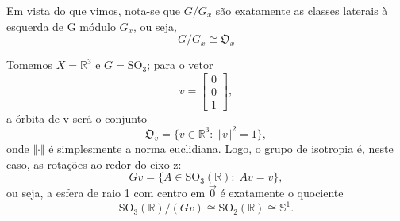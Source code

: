 \documentclass[../algebraIII_notes.tex]{subfiles}
\begin{document}
\begin{tcolorbox}[
		skin=enhanced,
		title=Observação,
		fonttitle=\bfseries,
		colframe=black,
		colbacktitle=cyan!75!white,
		colback=cyan!15,
		colbacklower=black,
		coltitle=black,
		drop fuzzy shadow,
	]
	Em vista do que vimos, nota-se que \(G/G_{x}\) são exatamente as classes laterais à esquerda de G módulo \(G_{x}\), ou seja,
	\[
		G/G_{x}\cong \mathfrak{O}_{x}
	\]
\end{tcolorbox}
\begin{example}
	Tomemos \(X = \mathbb{R}^{3}\) e \(G = \mathrm{SO}_{3}\); para o vetor
	\[
		v = \begin{bmatrix}
			0 \\
			0 \\
			1
		\end{bmatrix},
	\]
	a órbita de v será o conjunto
	\[
		\mathfrak{O}_{v} = \{v\in \mathbb{R}^{3}:\; \Vert v \Vert^{2}=1\},
	\]
	onde \(\Vert \cdot  \Vert\) é simplesmente a norma euclidiana. Logo, o grupo de isotropia é, neste caso, as rotações ao redor do eixo z:
	\[
		Gv = \{A\in \mathrm{SO}_{3}(\mathbb{R}):\; Av = v\},
	\]
	ou seja, a esfera de raio 1 com centro em \(\vec{0}\) é exatamente o quociente
	\[
		\mathrm{SO}_{3}(\mathbb{R})/(Gv) \cong \mathrm{SO}_{2}(\mathbb{R}) \cong \mathbb{S}^{1}.
	\]
\end{example}
\end{document}
